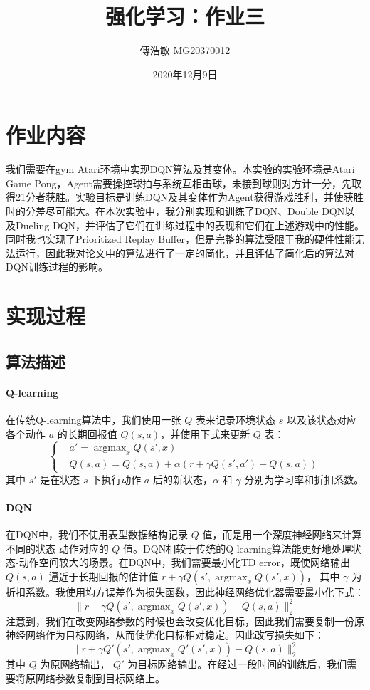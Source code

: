 \documentclass[a4paper,12pt]{article}
\begin{document}
\begin{CJK}{UTF8}{gbsn}

\title{强化学习：作业三}

\author{傅浩敏 MG20370012}

\date{2020年12月9日}

\maketitle

\section{作业内容}
我们需要在gym Atari环境中实现DQN算法及其变体。本实验的实验环境是Atari Game Pong，Agent需要操控球拍与系统互相击球，未接到球则对方计一分，先取得21分者获胜。实验目标是训练DQN及其变体作为Agent获得游戏胜利，并使获胜时的分差尽可能大。在本次实验中，我分别实现和训练了DQN\cite{ref1}、Double DQN\cite{ref2}以及Dueling DQN\cite{ref3}，并评估了它们在训练过程中的表现和它们在上述游戏中的性能。同时我也实现了Prioritized Replay Buffer\cite{ref4}，但是完整的算法受限于我的硬件性能无法运行，因此我对论文中的算法进行了一定的简化，并且评估了简化后的算法对DQN训练过程的影响。

\section{实现过程}
\subsection{算法描述}
\paragraph{Q-learning\cite{ref5}} 在传统Q-learning算法中，我们使用一张 $Q$ 表来记录环境状态 $s$ 以及该状态对应各个动作 $a$ 的长期回报值 $Q(s,a)$，并使用下式来更新 $Q$ 表：
$$
\begin{cases}
	&a'= \mathop{\arg\max}_{x} Q(s',x)\\
	&Q(s,a)=Q(s,a)+\alpha(r+\gamma Q(s',a')-Q(s,a)) 
\end{cases}
$$
其中 $s'$ 是在状态 $s$ 下执行动作 $a$ 后的新状态，$\alpha$ 和 $\gamma$ 分别为学习率和折扣系数。
\paragraph{DQN} 在DQN中，我们不使用表型数据结构记录 $Q$ 值，而是用一个深度神经网络来计算不同的状态-动作对应的 $Q$ 值。DQN相较于传统的Q-learning算法能更好地处理状态-动作空间较大的场景。在DQN中，我们需要最小化TD error，既使网络输出 $Q(s,a)$ 逼近于长期回报的估计值 $r+\gamma Q(s',\mathop{\arg\max}_{x} Q(s',x))$， 其中 $\gamma$ 为折扣系数。我使用均方误差作为损失函数，因此神经网络优化器需要最小化下式：
$$
\|r+\gamma Q(s',\mathop{\arg\max}_{x} Q(s',x))-Q(s,a)\|_2^2
$$
注意到，我们在改变网络参数的时候也会改变优化目标，因此我们需要复制一份原神经网络作为目标网络，从而使优化目标相对稳定。因此改写损失如下：
$$
\|r+\gamma Q'(s',\mathop{\arg\max}_{x} Q'(s',x))-Q(s,a)\|_2^2
$$
其中 $Q$ 为原网络输出， $Q'$ 为目标网络输出。在经过一段时间的训练后，我们需要将原网络参数复制到目标网络上。

\end{CJK}
\end{document}
